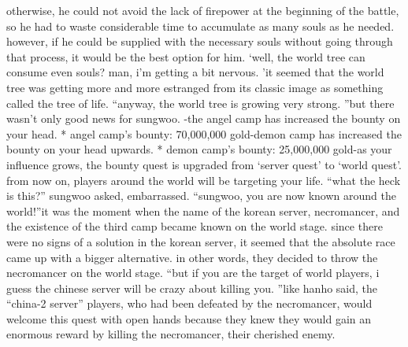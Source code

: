 otherwise, he could not avoid the lack of firepower at the beginning of the battle, so he had to waste considerable time to accumulate as many souls as he needed.
however, if he could be supplied with the necessary souls without going through that process, it would be the best option for him.
‘well, the world tree can consume even souls? man, i’m getting a bit nervous.
’it seemed that the world tree was getting more and more estranged from its classic image as something called the tree of life.
“anyway, the world tree is growing very strong.
”but there wasn’t only good news for sungwoo.
-the angel camp has increased the bounty on your head.
* angel camp’s bounty: 70,000,000 gold-demon camp has increased the bounty on your head upwards.
* demon camp’s bounty: 25,000,000 gold-as your influence grows, the bounty quest is upgraded from ‘server quest’ to ‘world quest’.
 from now on, players around the world will be targeting your life.
“what the heck is this?” sungwoo asked, embarrassed.
“sungwoo, you are now known around the world!”it was the moment when the name of the korean server, necromancer, and the existence of the third camp became known on the world stage.
since there were no signs of a solution in the korean server, it seemed that the absolute race came up with a bigger alternative.
 in other words, they decided to throw the necromancer on the world stage.
“but if you are the target of world players, i guess the chinese server will be crazy about killing you.
”like hanho said, the “china-2 server” players, who had been defeated by the necromancer, would welcome this quest with open hands because they knew they would gain an enormous reward by killing the necromancer, their cherished enemy.


 